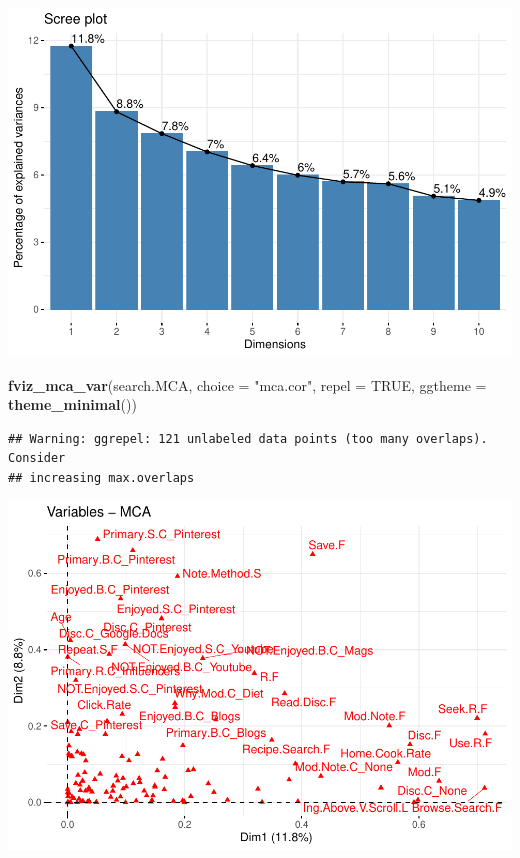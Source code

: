 \documentclass[
]{article}
\newenvironment{Shaded}{\begin{snugshade}}{\end{snugshade}}
\newcommand{\DataTypeTok}[1]{\textcolor[rgb]{0.13,0.29,0.53}{#1}}
\newcommand{\KeywordTok}[1]{\textcolor[rgb]{0.13,0.29,0.53}{\textbf{#1}}}
\newcommand{\NormalTok}[1]{#1}
\newcommand{\OtherTok}[1]{\textcolor[rgb]{0.56,0.35,0.01}{#1}}
\newcommand{\StringTok}[1]{\textcolor[rgb]{0.31,0.60,0.02}{#1}}
\begin{document}
\includegraphics{Average-User-MCA_files/figure-latex/mca all search data-1.pdf}

\begin{Shaded}
\begin{Highlighting}[]
\KeywordTok{fviz_mca_var}\NormalTok{(search.MCA, }\DataTypeTok{choice =} \StringTok{"mca.cor"}\NormalTok{, }\DataTypeTok{repel =} \OtherTok{TRUE}\NormalTok{,}
             \DataTypeTok{ggtheme =} \KeywordTok{theme_minimal}\NormalTok{())}
\end{Highlighting}
\end{Shaded}

\begin{verbatim}
## Warning: ggrepel: 121 unlabeled data points (too many overlaps). Consider
## increasing max.overlaps
\end{verbatim}

\includegraphics{Average-User-MCA_files/figure-latex/mca all search data-2.pdf}
\end{document}
